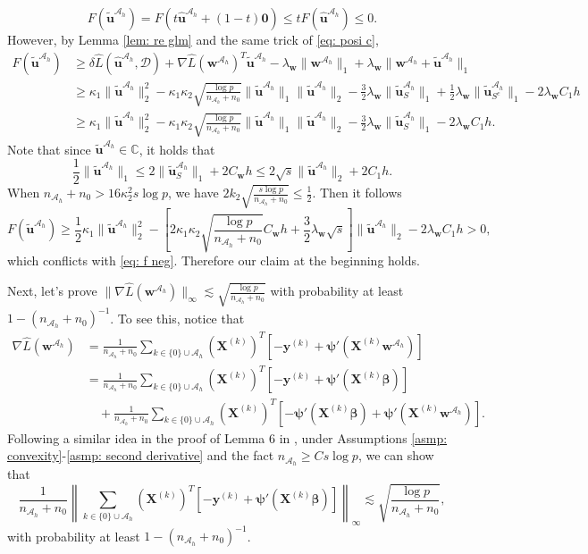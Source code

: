 \documentclass[12pt]{article}
\newcommand{\infnorma}[1]{\left\|#1\right\|_{\infty}}
\newcommand{\infnorm}[1]{\|#1\|_{\infty}}
\newcommand{\twonorm}[1]{\|#1\|_{2}}
\newcommand{\onenorm}[1]{\|#1\|_{1}}
\newcommand{\bbeta}{\bm{\beta}}
\newcommand{\byk}[1]{\bm{y}^{(#1)}}
\newcommand{\bXk}[1]{\bm{X}^{(#1)}}
\newcommand{\bu}{\bm{u}}
\newcommand{\huah}{\hat{\bm{u}}^{\mathcal{A}_h}}
\newcommand{\bw}{\bm{w}}
\newcommand{\bwah}{\bm{w}^{\mathcal{A}_h}}
\newcommand{\mah}{\mathcal{A}_h}
\newcommand{\md}{\mathcal{D}}
\newcommand{\nah}{n_{\mathcal{A}_h}}
\newcommand{\transet}{\{0\}\cup \mah}
\newcommand{\bpsi}{\bm{\psi}}
\newcommand{\<}{\langle}
\renewcommand{\>}{\rangle}
\begin{document}
	\begin{equation}\label{eq: f neg}
		F(\tilde{\bu}^{\mah}) = F(t\huah + (1-t)\bm{0}) \leq tF(\huah) \leq 0.
	\end{equation}
	However, by Lemma \ref{lem: re glm} and the same trick of \eqref{eq: posi c},
	\begin{align}
		F(\tilde{\bu}^{\mah}) &\geq \delta \hat{L}(\huah, \md) + \nabla \hat{L}(\bwah)^T \tilde{\bu}^{\mah} -\lambda_{\bw}\onenorm{\bwah} + \lambda_{\bw}\onenorm{\bwah + \tilde{\bu}^{\mah}} \\
		&\geq \kappa_1 \twonorm{\tilde{\bu}^{\mah}}^2 - \kappa_1\kappa_2\sqrt{\frac{\log p}{\nah + n_0}}\onenorm{\tilde{\bu}^{\mah}}\twonorm{\tilde{\bu}^{\mah}} - \frac{3}{2}\lambda_{\bw}\onenorm{\tilde{\bu}^{\mah}_S} + \frac{1}{2}\lambda_{\bw}\onenorm{\tilde{\bu}^{\mah}_{S^c}} - 2\lambda_{\bw}C_1h \\
		&\geq \kappa_1 \twonorm{\tilde{\bu}^{\mah}}^2 - \kappa_1\kappa_2\sqrt{\frac{\log p}{\nah + n_0}}\onenorm{\tilde{\bu}^{\mah}}\twonorm{\tilde{\bu}^{\mah}} - \frac{3}{2}\lambda_{\bw}\onenorm{\tilde{\bu}^{\mah}_S}  - 2\lambda_{\bw}C_1h.
	\end{align}
	Note that since $\tilde{\bu}^{\mah} \in \mathds{C}$, it holds that
	\begin{equation}
		\frac{1}{2}\onenorm{\tilde{\bu}^{\mah}} \leq 2\onenorm{\tilde{\bu}^{\mah}_S} + 2C_{\bw}h \leq 2\sqrt{s}\twonorm{\tilde{\bu}^{\mah}} + 2C_1h.
	\end{equation}
	When $\nah + n_0 > 16\kappa_2^2s\log p$, we have $2k_2\sqrt{\frac{s\log p}{\nah+n_0}} \leq \frac{1}{2}$. Then it follows
	\begin{equation}
		F(\tilde{\bu}^{\mah}) \geq \frac{1}{2}\kappa_1 \twonorm{\tilde{\bu}^{\mah}}^2 - \left[2\kappa_1\kappa_2\sqrt{\frac{\log p}{\nah + n_0}}C_{\bw}h + \frac{3}{2}\lambda_{\bw}\sqrt{s}\right]\twonorm{\tilde{\bu}^{\mah}} - 2\lambda_{\bw}C_1h > 0,
	\end{equation}
	which conflicts with \eqref{eq: f neg}. Therefore our claim at the beginning holds. 
	
	Next, let's prove $\infnorm{\nabla \hat{L}(\bwah)} \lesssim \sqrt{\frac{\log p}{\nah + n_0}}$ with probability at least $1-(\nah + n_0)^{-1}$. To see this, notice that
	\begin{align}
		\nabla \hat{L}(\bwah) &= \frac{1}{\nah + n_0}\sum_{k \in \transet}(\bXk{k})^T[-\byk{k} + \bpsi'(\bXk{k}\bwah)] \\
		&= \frac{1}{\nah + n_0}\sum_{k \in \transet}(\bXk{k})^T[-\byk{k} + \bpsi'(\bXk{k}\bbeta)]\\ 
		&\quad + \frac{1}{\nah + n_0}\sum_{k \in \transet}(\bXk{k})^T[-\bpsi'(\bXk{k}\bbeta) + \bpsi'(\bXk{k}\bwah)]. \label{eq: decomp nabla}
	\end{align}
	Following a similar idea in the proof of Lemma 6 in \cite{negahban2009unified}, under Assumptions \ref{asmp: convexity}-\ref{asmp: second derivative} and the fact $\nah \geq Cs\log p$, we can show that
	\begin{equation}
		\frac{1}{\nah + n_0}\infnorma{\sum_{k \in \transet}(\bXk{k})^T[-\byk{k} + \bpsi'(\bXk{k}\bbeta)]} \lesssim \sqrt{\frac{\log p}{\nah + n_0}},
	\end{equation}
	with probability at least $1-(\nah + n_0)^{-1}$.
	
\end{document}
